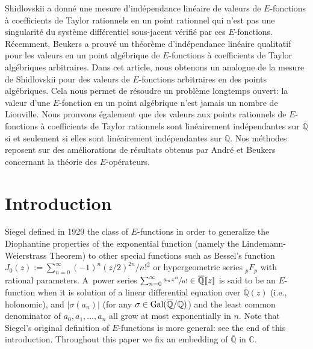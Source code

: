 \documentclass[JEP,XML,SOM,Unicode,published]{cedram}
\newcommand{\lcr}{[\![}
\newcommand{\rcr}{]\!]}
\newcommand{\Efunction}{$E$\nobreakdash-func\-tion\xspace}
\newcommand{\Efunctions}{$E$\nobreakdash-func\-tions\xspace}
\theoremstyle{definition}
\newcommand{\Q}{\mathbb{Q}}
\newcommand{\C}{\mathbb{C}}
\newcommand{\Qbar}{\overline{\mathbb Q}}
\begin{document}
\begin{altabstract}
Shidlovskii a donné une mesure d'indépendance linéaire de valeurs de $E$-fonctions à coefficients de Taylor rationnels en un point rationnel qui n'est pas une singularité du système différentiel sous-jacent vérifié par ces $E$-fonctions. Récemment, Beukers a prouvé un théorème d'indépendance linéaire qualitatif pour les valeurs en un point algébrique de $E$-fonctions à coef\-ficients de Taylor algébriques arbitraires. Dans cet article, nous obtenons un analogue de la mesure de Shidlovskii pour des valeurs de $E$-fonctions arbitraires en des points algébriques. Cela nous permet de résoudre un problème longtemps ouvert: la valeur d'une $E$-fonction en un point algébrique n'est jamais un nombre de Liouville. Nous prouvons également que des valeurs aux points rationnels de $E$-fonctions à coefficients de Taylor rationnels sont linéairement indépendantes sur $\overline{\mathbb{Q}}$ si et seulement si elles sont linéairement indépendantes sur $\mathbb{Q}$. Nos méthodes reposent sur des améliorations de résultats obtenus par André et Beukers concernant la théorie des $E$-opérateurs.
\end{altabstract}

\maketitle
\vspace*{-\baselineskip}
\tableofcontents
\mainmatter

\section{Introduction}
Siegel \cite{siegel} defined in 1929 the class of \Efunctions in order to generalize the Diophantine properties of the exponential function (namely the Lindemann-Weierstrass Theorem) to other special functions such as Bessel's function $J_0(z):=\sum_{n=0}^\infty (-1)^n(z/2)^{2n}/n!^2$ or hypergeometric series ${}_pF_p$ with rational parameters.
A~power series $\sum_{n=0}^\infty \sfrac{a_nz^n}{n!}  \in \Qbar\lcr z\rcr$ is said to be an \Efunction when it is solution of a linear differential equation over $\Qbar(z)$ (i.e., holonomic),
and $\vert \sigma(a_n)\vert$ (for any $\sigma\in \textup{Gal}(\Qbar/\Q)$) and the least common denominator of $a_0, a_1, \ldots, a_n$ all grow at most exponentially in $n$. Note that Siegel's original definition of \Efunctions is more general: see the end of this introduction.
Throughout this paper we fix an embedding of $\Qbar $ in $\C$.
\end{document}
